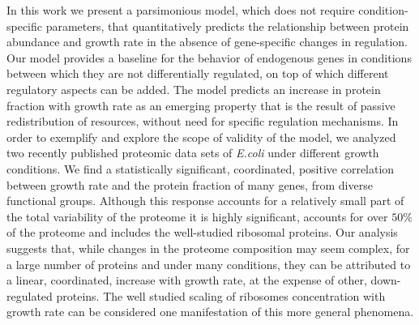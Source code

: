 In this work we present a parsimonious model, which does not require condition-specific parameters, that quantitatively predicts the relationship between protein abundance and growth rate in the absence of gene-specific changes in regulation.
Our model provides a baseline for the behavior of endogenous genes in conditions between which they are not differentially regulated, on top of which different regulatory aspects can be added.
The model predicts an increase in protein fraction with growth rate as an emerging property that is the result of passive redistribution of resources, without need for specific regulation mechanisms.
In order to exemplify and explore the scope of validity of the model, we analyzed two recently published proteomic data sets of \emph{E.coli} under different growth conditions\cite{Peebo_2015,Heinemann2015}.
We find a statistically significant, coordinated, positive correlation between growth rate and the protein fraction of many genes, from diverse functional groups.
Although this response accounts for a relatively small part of the total variability of the proteome it is highly significant, accounts for over $50\%$ of the proteome and includes the well-studied ribosomal proteins.
Our analysis suggests that, while changes in the proteome composition may seem complex, for a large number of proteins and under many conditions, they can be attributed to a linear, coordinated, increase with growth rate, at the expense of other, down-regulated proteins.
The well studied scaling of ribosomes concentration with growth rate can be considered one manifestation of this more general phenomena.